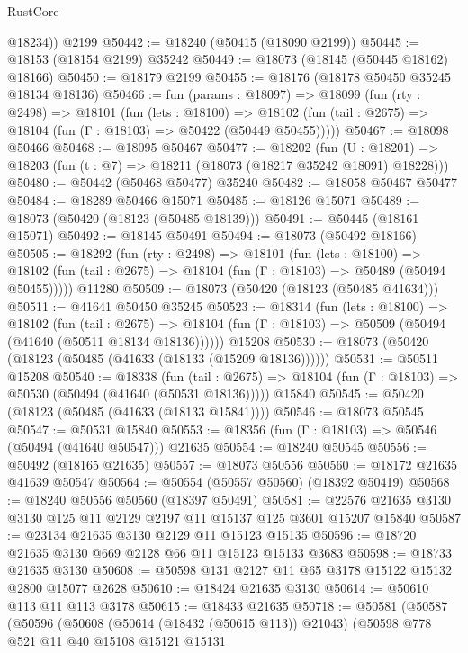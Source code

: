 \begin{lexlean}{RustCore}
\begin{coremodule}
        @18234))
    @2199
@50442 := @18240 (@50415 (@18090 @2199))
@50445 := @18153 (@18154 @2199) @35242
@50449 := @18073 (@18145 (@50445 @18162) @18166)
@50450 := @18179 @2199
@50455 := @18176 (@18178 @50450 @35245 @18134 @18136)
@50466 := fun (params : @18097) =>
  @18099
    (fun (rty : @2498) =>
    @18101
      (fun (lets : @18100) =>
      @18102 (fun (tail : @2675) => @18104 (fun (Γ : @18103) => @50422 (@50449 @50455)))))
@50467 := @18098 @50466
@50468 := @18095 @50467
@50477 := @18202
    (fun (U : @18201) => @18203 (fun (t : @7) => @18211 (@18073 (@18217 @35242 @18091) @18228)))
@50480 := @50442 (@50468 @50477) @35240
@50482 := @18058 @50467 @50477
@50484 := @18289 @50466 @15071
@50485 := @18126 @15071
@50489 := @18073 (@50420 (@18123 (@50485 @18139)))
@50491 := @50445 (@18161 @15071)
@50492 := @18145 @50491
@50494 := @18073 (@50492 @18166)
@50505 := @18292
    (fun (rty : @2498) =>
    @18101
      (fun (lets : @18100) =>
      @18102 (fun (tail : @2675) => @18104 (fun (Γ : @18103) => @50489 (@50494 @50455)))))
    @11280
@50509 := @18073 (@50420 (@18123 (@50485 @41634)))
@50511 := @41641 @50450 @35245
@50523 := @18314
    (fun (lets : @18100) =>
    @18102
      (fun (tail : @2675) =>
      @18104 (fun (Γ : @18103) => @50509 (@50494 (@41640 (@50511 @18134 @18136))))))
    @15208
@50530 := @18073 (@50420 (@18123 (@50485 (@41633 (@18133 (@15209 @18136))))))
@50531 := @50511 @15208
@50540 := @18338
    (fun (tail : @2675) => @18104 (fun (Γ : @18103) => @50530 (@50494 (@41640 (@50531 @18136)))))
    @15840
@50545 := @50420 (@18123 (@50485 (@41633 (@18133 @15841))))
@50546 := @18073 @50545
@50547 := @50531 @15840
@50553 := @18356 (fun (Γ : @18103) => @50546 (@50494 (@41640 @50547))) @21635
@50554 := @18240 @50545
@50556 := @50492 (@18165 @21635)
@50557 := @18073 @50556
@50560 := @18172 @21635 @41639 @50547
@50564 := @50554 (@50557 @50560) (@18392 @50419)
@50568 := @18240 @50556 @50560 (@18397 @50491)
@50581 := @22576 @21635 @3130 @3130 @125 @11 @2129 @2197 @11 @15137 @125 @3601 @15207 @15840
@50587 := @23134 @21635 @3130 @2129 @11 @15123 @15135
@50596 := @18720 @21635 @3130 @669 @2128 @66 @11 @15123 @15133 @3683
@50598 := @18733 @21635 @3130
@50608 := @50598 @131 @2127 @11 @65 @3178 @15122 @15132 @2800 @15077 @2628
@50610 := @18424 @21635 @3130
@50614 := @50610 @113 @11 @113 @3178
@50615 := @18433 @21635
@50718 := @50581
    (@50587
      (@50596
        (@50608
          (@50614 (@18432 (@50615 @113)) @21043)
          (@50598
            @778
            @521
            @11
            @40
            @15108
            @15121
            @15131

\end{coremodule}
\end{lexlean}
